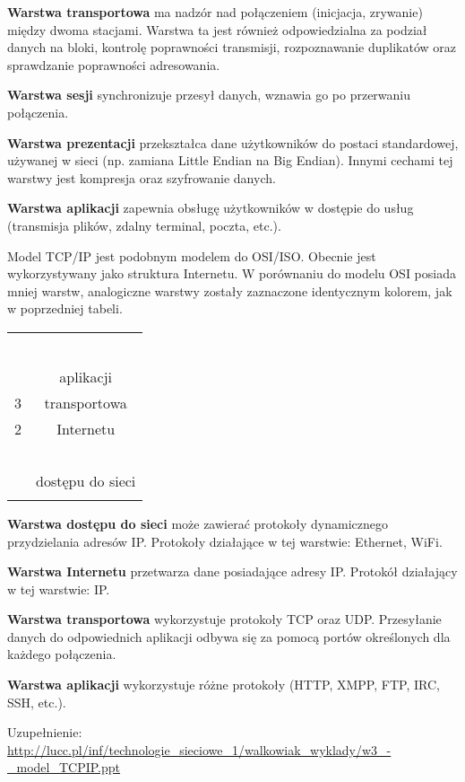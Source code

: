 \textbf{Warstwa transportowa} ma nadzór nad połączeniem (inicjacja, zrywanie) między dwoma stacjami. Warstwa ta jest również odpowiedzialna za podział danych na bloki, kontrolę poprawności transmisji, rozpoznawanie duplikatów oraz sprawdzanie poprawności adresowania.

\textbf{Warstwa sesji} synchronizuje przesył danych, wznawia go po przerwaniu połączenia.

\textbf{Warstwa prezentacji} przekształca dane użytkowników do postaci standardowej, używanej w sieci (np. zamiana Little Endian na Big Endian). Innymi cechami tej warstwy jest kompresja oraz szyfrowanie danych.

\textbf{Warstwa aplikacji} zapewnia obsługę użytkowników w dostępie do usług (transmisja plików, zdalny terminal, poczta, etc.).

Model TCP/IP jest podobnym modelem do OSI/ISO. Obecnie jest wykorzystywany jako struktura Internetu. W porównaniu do modelu OSI posiada mniej warstw, analogiczne warstwy zostały zaznaczone identycznym kolorem, jak w poprzedniej tabeli.

\begin{table}[H]
\centering
\begin{tabular}{c|c|} \hhline{~-}
\multirow{3}{*}{4} & \cellcolor{blue!20}    \\ \hhline{~~}
~ & \cellcolor{blue!20}  \\ \hhline{~~}
~ & \multirow{-3}{*}{\cellcolor{blue!20}aplikacji}  \\ \hhline{~-}
3 & \cellcolor{red!20}transportowa \\ \hhline{~-}
2 & \cellcolor{green!20}Internetu     \\ \hhline{~-}
\multirow{2}{*}{1} & \cellcolor{yellow!20}~ \\ \hhline{~~}
~ & \multirow{-2}{*}{\cellcolor{yellow!20}dostępu do sieci}     \\ \hhline{~-}
\end{tabular}
\end{table}

\textbf{Warstwa dostępu do sieci} może zawierać protokoły dynamicznego przydzielania adresów IP. Protokoły działające w tej warstwie: Ethernet, WiFi.

\textbf{Warstwa Internetu} przetwarza dane posiadające adresy IP. Protokół działający w tej warstwie: IP.

\textbf{Warstwa transportowa} wykorzystuje protokoły TCP oraz UDP. Przesyłanie danych do odpowiednich aplikacji odbywa się za pomocą portów określonych dla każdego połączenia.

\textbf{Warstwa aplikacji} wykorzystuje różne protokoły (HTTP, XMPP, FTP, IRC, SSH, etc.).

Uzupełnienie: \url{http://lucc.pl/inf/technologie_sieciowe_1/walkowiak_wyklady/w3_-_model_TCPIP.ppt}

